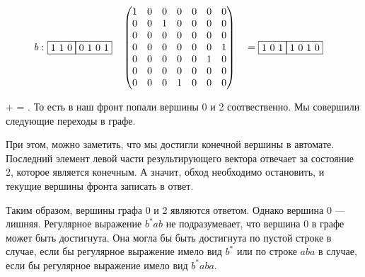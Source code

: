 \begin{example}
\begin{alignat*}{7}
  b:\,\,
  & \begin{matrix}
    \fbox{1 1 0} \fbox{0 1 0 1}
    \end{matrix}  && \begin{pmatrix}
      1 & 0 & 0 & 0 & 0 & 0 & 0 \\
      0 & 0 & 1 & 0 & 0 & 0 & 0 \\
      0 & 0 & 0 & 0 & 0 & 0 & 0 \\
      0 & 0 & 0 & 0 & 0 & 0 & 1 \\
      0 & 0 & 0 & 0 & 0 & 1 & 0 \\
      0 & 0 & 0 & 0 & 0 & 0 & 0 \\
      0 & 0 & 0 & 1 & 0 & 0 & 0 
      \end{pmatrix} &&= \begin{matrix}
        \fbox{1 0 1} \fbox{1 0 1 0}
    \end{matrix}
\end{alignat*}

   +   =  .
То есть в наш фронт  попали вершины 0 и 2 соотвественно. Мы совершили следующие переходы в графе.

\begin{center}
  \label{input_rpq}
\end{center}

При этом, можно заметить, что мы достигли конечной вершины в автомате. Последний элемент левой части результирующего
вектора   отвечает за состояние 2, которое является конечным. А значит, обход необходимо остановить, и текущие вершины фронта
записать в ответ.

Таким образом, вершины графа 0 и 2 являются ответом. Однако вершина 0 --- лишняя. Регулярное выражение $b^*ab$ не подразумевает, что
вершина 0 в графе может быть достигнута. Она могла бы быть достигнута по пустой строке в случае, если бы регулярное выражение имело вид $b^*$ или
по строке $aba$ в случае, если бы регулярное выражение имело вид $b^*aba$.


\end{example}

